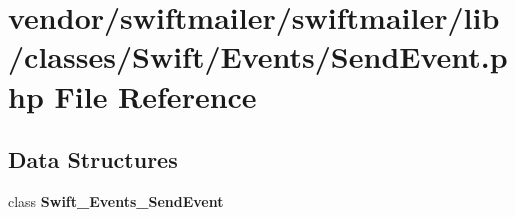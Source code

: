 \section{vendor/swiftmailer/swiftmailer/lib/classes/\+Swift/\+Events/\+Send\+Event.php File Reference}
\label{_send_event_8php}
\subsection*{Data Structures}
\begin{DoxyCompactItemize}
\item 
class {\bf Swift\+\_\+\+Events\+\_\+\+Send\+Event}
\end{DoxyCompactItemize}
